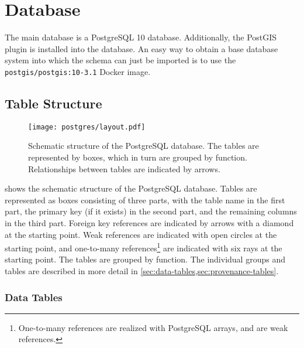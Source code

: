 \chapter{Database}

The main database is a PostgreSQL 10 database.
Additionally, the PostGIS plugin is installed into the database.
An easy way to obtain a base database system into which the schema can just be imported is to use the \verb!postgis/postgis:10-3.1! Docker image.


\section{Table Structure}

\begin{figure}[tb]
  \centering
  \texttt{[image: postgres/layout.pdf]}
  \caption{%
    Schematic structure of the PostgreSQL database.
    The tables are represented by boxes, which in turn are grouped by function.
    Relationships between tables are indicated by arrows.
    }
  \label{fig:db-structure}
\end{figure}

 shows the schematic structure of the PostgreSQL database.
Tables are represented as boxes consisting of three parts, with the table name in the first part, the primary key (if it exists) in the second part, and the remaining columns in the third part.
Foreign key references are indicated by
arrows with a diamond at the starting point.
Weak references are indicated with
open circles at the starting point, and one-to-many references\footnote{One-to-many references are realized with PostgreSQL arrays, and are weak references.}
are indicated with six rays at the starting point.
The tables are grouped by function.
The individual groups and tables are described in more detail in \cref{sec:data-tables,sec:provenance-tables}.


\subsection{Data Tables}
\label{sec:data-tables}

